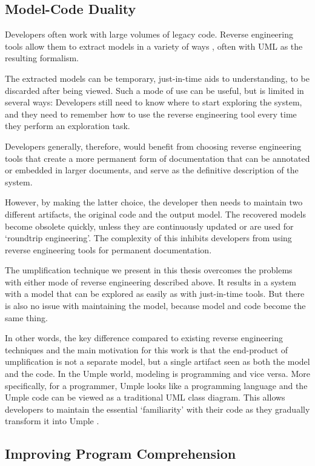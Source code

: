 \subsection{Model-Code Duality}

Developers often work with large volumes of legacy code. Reverse engineering tools allow them to extract models in a variety of ways \cite{OsmanChaudron}, often with UML as the resulting formalism.

The extracted models can be temporary, just-in-time aids to understanding, to be discarded after being viewed. Such a mode of use can be useful, but is limited in several ways: Developers still need to know where to start exploring the system, and they need to remember how to use the reverse engineering tool every time they perform an exploration task. 

Developers generally, therefore, would benefit from choosing reverse engineering tools that create a more permanent form of documentation that can be annotated or embedded in larger documents, and serve as the definitive description of the system. 

However, by making the latter choice, the developer then needs to maintain two different artifacts, the original code and the output model. The recovered models become obsolete quickly, unless they are continuously updated or are used for `roundtrip engineering'.  The complexity of this inhibits developers from using reverse engineering tools for permanent documentation.

The umplification technique we present in this thesis overcomes the problems with either mode of reverse engineering described above. It results in a system with a model that can be explored as easily as with just-in-time tools. But there is also no issue with maintaining the model, because model and code become the same thing.

In other words, the key difference compared to existing reverse engineering techniques and the main motivation for this work is that the end-product of umplification is not a separate model, but a single artifact seen as both the model and the code. In the Umple world, modeling is programming and vice versa. More specifically, for a programmer, Umple looks like a programming language and the Umple code can be viewed as a traditional UML class diagram. This allows developers to maintain the essential `familiarity' with their code as they gradually transform it into Umple \cite{Forward2008}. 

\subsection{Improving Program Comprehension}

